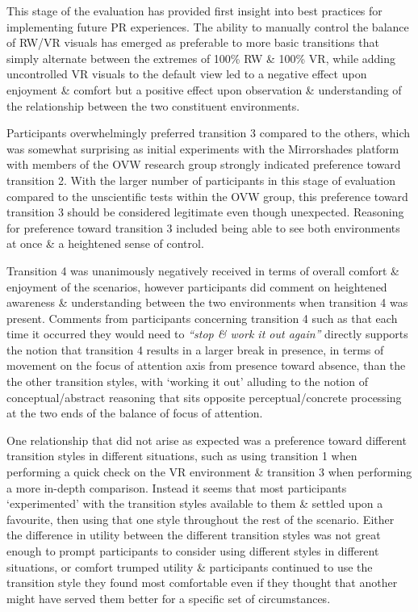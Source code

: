 This stage of the evaluation has provided first insight into best practices for implementing future PR experiences. The ability to manually control the balance of RW/VR visuals has emerged as preferable to more basic transitions that simply alternate between the extremes of 100\% RW \& 100\% VR, while adding uncontrolled VR visuals to the default view led to a negative effect upon enjoyment \& comfort but a positive effect upon observation \& understanding of the relationship between the two constituent environments.

Participants overwhelmingly preferred transition 3 compared to the others, which was somewhat surprising as initial experiments with the Mirrorshades platform with members of the OVW research group strongly indicated preference toward transition 2. With the larger number of participants in this stage of evaluation compared to the unscientific tests within the OVW group, this preference toward transition 3 should be considered legitimate even though unexpected. Reasoning for preference toward transition 3 included being able to see both environments at once \& a heightened sense of control.

Transition 4 was unanimously negatively received in terms of overall comfort \& enjoyment of the scenarios, however participants did comment on heightened awareness \& understanding between the two environments when transition 4 was present. Comments from participants concerning transition 4 such as that each time it occurred they would need to \textit{``stop \& work it out again''} directly supports the notion that transition 4 results in a larger break in presence, in terms of movement on the focus of attention axis from presence toward absence, than the the other transition styles, with `working it out' alluding to the notion of conceptual/abstract reasoning that sits opposite perceptual/concrete processing at the two ends of the balance of focus of attention.

One relationship that did not arise as expected was a preference toward different transition styles in different situations, such as using transition 1 when performing a quick check on the VR environment \& transition 3 when performing a more in-depth comparison. Instead it seems that most participants `experimented' with the transition styles available to them \& settled upon a favourite, then using that one style throughout the rest of the scenario. Either the difference in utility between the different transition styles was not great enough to prompt participants to consider using different styles in different situations, or comfort trumped utility \& participants continued to use the transition style they found most comfortable even if they thought that another might have served them better for a specific set of circumstances.

